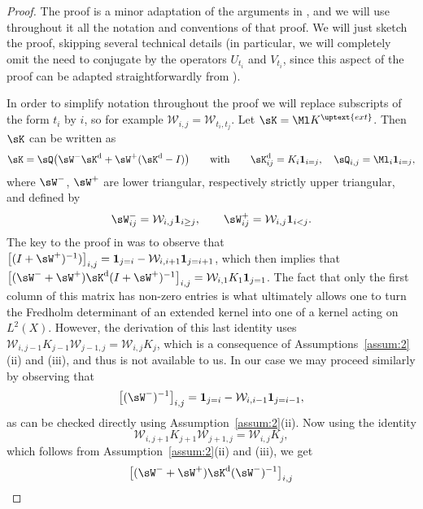 \documentclass[]{pcmi}
\theoremstyle{plain}
\theoremstyle{definition}
\newcommand{\uno}[1]{\mathbf{1}_{#1}}
\begin{document}
\begin{proof}
  The proof is a minor adaptation of the arguments in \cite[Thm. 3.3]{bcr}, and we will use throughout it all the notation and conventions of that proof.
  We will just sketch the proof, skipping several technical details (in particular, we will completely omit the need to conjugate by the operators $U_{t_i}$ and $V_{t_i}$, since this aspect of the proof can be adapted straightforwardly from \cite{bcr}).

  In order to simplify notation throughout the proof we will replace subscripts of the form $t_i$ by $i$, so for example $\mathcal{W}_{i,j}=\mathcal{W}_{t_i,t_j}$.
  Let $\sK=\Ml K^\uptext{ext}$. Then $\sK$ can
  be written as
  \begin{equation}
    \sK=\sQ \bigl(\sW^{-}\sK^{\rm d}+\sW^{+}(\sK^{\rm d}-I)\bigr)\qquad\text{with}\qquad
    \sK^{\rm d}_{ij}=K_{i}\uno{i=j},\quad \sQ_{i,j}=\Ml_{{i}}\uno{i=j},
  \end{equation}
  where $\sW^{-}$, $\sW^{+}$ are lower triangular, respectively strictly upper triangular, and defined by
  \begin{equation*}
    \sW^{-}_{ij} = \mathcal{W}_{i,j}\uno{i\geq j},\qquad
    \sW^{+}_{ij}=\mathcal{W}_{{i},{j}}\uno{i < j}.
  \end{equation*}
  The key to the proof in \cite{bcr} was to observe that $\big[(I+\sW^{+})^{-1})\big]_{i,j}=\uno{j=i}-\mathcal{W}_{{i},{i+1}}\uno{j=i+1}$, which then implies that $\big[(\sW^{-}+\sW^{+})\sK^{\rm d}(I+\sW^{+})^{-1}\big]_{i,j}=\mathcal{W}_{{i},{1}}K_{1}\uno{j=1}$.
  The fact that only the first column of this matrix has non-zero entries is what ultimately allows one to turn the Fredholm determinant of an extended kernel into one of a kernel acting on $L^2(X)$.
  However, the derivation of this last identity uses $\mathcal{W}_{i,{j-1}}K_{j-1}\mathcal{W}_{{j-1},j}=\mathcal{W}_{i,j}K_{j}$, which is a consequence of Assumptions~\ref{assum:2}(ii) and (iii), and thus is not available to us. In our case we may proceed similarly by observing that
  \begin{equation}
    \big[(\sW^{-})^{-1}\big]_{i,j}=\uno{j=i}-\mathcal{W}_{{i},{i-1}}\uno{j=i-1},
  \end{equation}
  as can be checked directly using Assumption~\ref{assum:2}(ii).
  Now using the identity \[\mathcal{W}_{i,{j+1}}K_{j+1}\mathcal{W}_{{j+1},j}=\mathcal{W}_{i,j}K_{j},\] which follows from Assumption~\ref{assum:2}(ii) and (iii), we get
  \begin{equation}
      \big[(\sW^{-}+\sW^{+})\sK^{\rm d}(\sW^{-})^{-1}\big]_{i,j}

\end{equation}
\end{proof}
\end{document}

